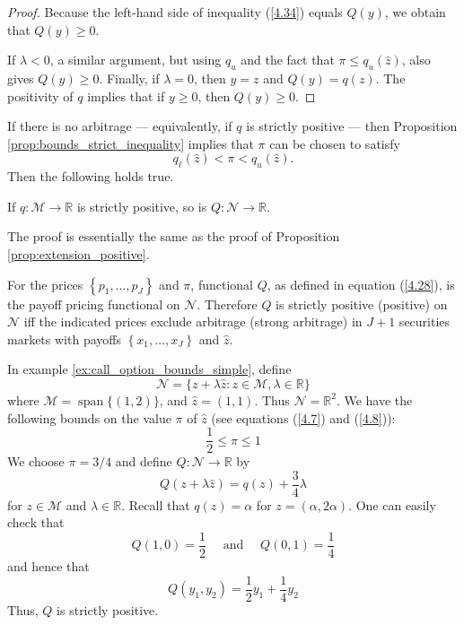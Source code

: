 \documentclass[\topdir/lecture\_notes.tex]{subfiles}
\begin{document}
\begin{optional}
\begin{proof}
Because the left-hand side of inequality (\ref{4.34}) equals $Q(y)$, we obtain that $Q(y) \geq 0$.

If $\lambda<0$, a similar argument, but using $q_{u}$ and the fact that $\pi \leq q_{u}(\hat{z})$, also gives $Q(y) \geq 0$. Finally, if $\lambda=0$, then $y=z$ and $Q(y)=q(z)$. The positivity of $q$ implies that if $y \geq 0$, then $Q(y) \geq 0$.
\end{proof}
If there is no arbitrage --- equivalently, if $q$ is strictly positive --- then Proposition \ref{prop:bounds_strict_inequality} implies that $\pi$ can be chosen to satisfy
\begin{equation*}
q_{\ell}(\hat{z})<\pi<q_{u}(\hat{z}) . 
\end{equation*}
Then the following holds true.
\begin{proposition} \label{prop:extension_strictly_positive}If $q: \mathcal{M} \rightarrow \mathbb{R}$ is strictly positive, so is $Q: \mathcal{N} \rightarrow \mathbb{R}$.
\end{proposition}
The proof is essentially the same as the proof of Proposition \ref{prop:extension_positive}.

For the prices $\left\{p_{1}, \ldots, p_{J}\right\}$ and $\pi$, functional $Q$, as defined in equation (\ref{4.28}), is the payoff pricing functional on $\mathcal{N}$. Therefore $Q$ is strictly positive (positive) on $\mathcal{N}$ iff the indicated prices exclude arbitrage (strong arbitrage) in $J+1$ securities markets with payoffs $\left\{x_{1}, \ldots, x_{J}\right\}$ and $\hat{z}$.
\begin{example}\label{ex:extension_example}
In example \ref{ex:call_option_bounds_simple}, define
\begin{equation*}
\mathcal{N}=\{z+\lambda \hat{z}: z \in \mathcal{M}, \lambda \in \mathbb{R}\} 
\end{equation*}
where $\mathcal{M}=\operatorname{span}\{(1,2)\}$, and $\hat{z}=(1,1)$. Thus $\mathcal{N}=\mathbb{R}^{2}$. We have the following bounds on the value $\pi$ of $\hat{z}$ (see equations (\ref{4.7}) and (\ref{4.8})):
\begin{equation*}
\frac{1}{2} \leq \pi \leq 1 
\end{equation*}
We choose $\pi=3 / 4$ and define $Q: \mathcal{N} \rightarrow \mathbb{R}$ by
\begin{equation*}
Q(z+\lambda \hat{z})=q(z)+\frac{3}{4} \lambda 
\end{equation*}
for $z \in \mathcal{M}$ and $\lambda \in \mathbb{R}$. Recall that $q(z)=\alpha$ for $z=(\alpha, 2 \alpha)$. One can easily check that
\begin{equation*}
Q(1,0)=\frac{1}{2} \quad \text { and } \quad Q(0,1)=\frac{1}{4} 
\end{equation*}
and hence that
\begin{equation*}
Q\left(y_{1}, y_{2}\right)=\frac{1}{2} y_{1}+\frac{1}{4} y_{2} 
\end{equation*}
Thus, $Q$ is strictly positive.
\end{example}
\end{optional}
\end{document}
